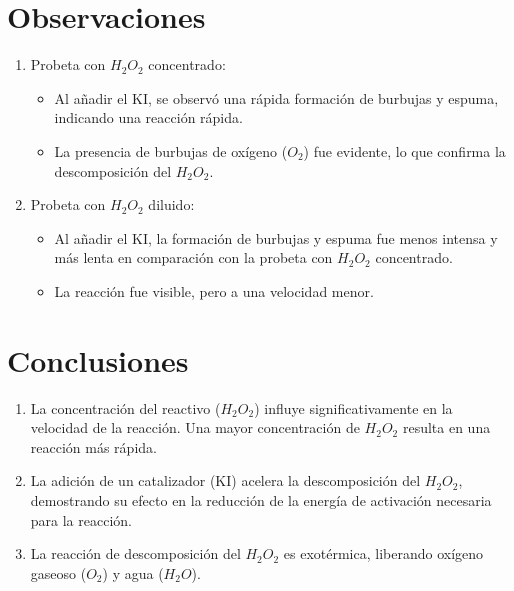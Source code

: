 \documentclass[12pt,a4paper]{report}
\begin{document}
\section*{Observaciones}
\begin{enumerate}[label=$\cdot$,left=1em]

  \item Probeta con $H_2O_2$ concentrado:
  \begin{itemize}
    \item Al añadir el KI, se observó una rápida formación de burbujas y espuma, indicando una reacción rápida.
    \item La presencia de burbujas de oxígeno ($O_2$) fue evidente, lo que confirma la descomposición del $H_2O_2$.
  \end{itemize}

  \item Probeta con $H_2O_2$ diluido:
  \begin{itemize}
    \item Al añadir el KI, la formación de burbujas y espuma fue menos intensa y más lenta en comparación con la probeta con $H_2O_2$ concentrado.
    \item La reacción fue visible, pero a una velocidad menor.
  \end{itemize}

\end{enumerate}

\section*{Conclusiones}
\begin{enumerate}[label=$\cdot$,left=1em]

  \item La concentración del reactivo ($H_2O_2$) influye significativamente en la velocidad de la reacción. Una mayor concentración de $H_2O_2$ resulta en una reacción más rápida.

  \item La adición de un catalizador (KI) acelera la descomposición del $H_2O_2$, demostrando su efecto en la reducción de la energía de activación necesaria para la reacción.

  \item La reacción de descomposición del $H_2O_2$ es exotérmica, liberando oxígeno gaseoso ($O_2$) y agua ($H_2O$).

\end{enumerate}
\end{document}
